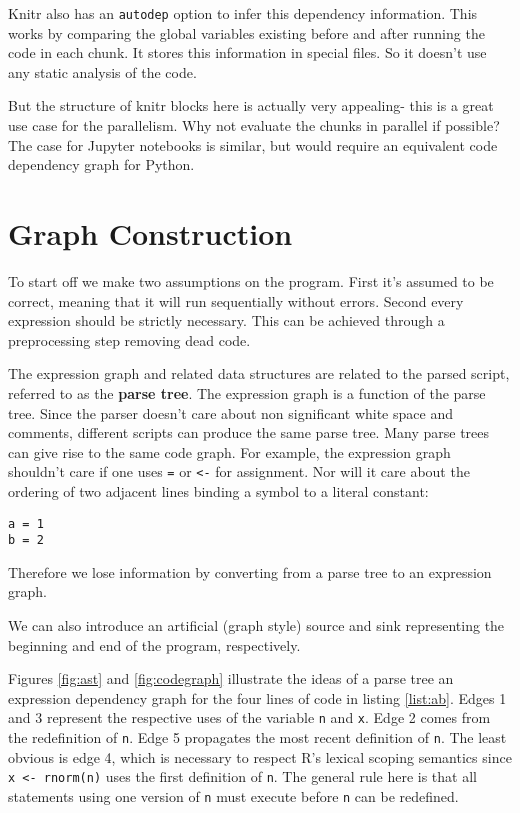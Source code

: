 \documentclass[12pt]{article}
\begin{document}
Knitr also has an \texttt{autodep} option to infer this dependency
information. This works by comparing the global variables existing before
and after running the code in each chunk. It stores this information in
special files. So it doesn't use any static analysis of the code.

But the structure of knitr blocks here is actually very appealing- this is
a great use case for the parallelism. Why not evaluate the chunks in
parallel if possible? The case for Jupyter notebooks is similar, but would
require an equivalent code dependency graph for Python.

\section{Graph Construction}

To start off we make two assumptions on the program. First it's assumed to
be correct, meaning that it will run sequentially without errors.
Second every expression should be strictly necessary. This can be achieved
through a preprocessing step removing dead code.

The expression graph and related data structures are related to the parsed
script, referred to as the \textbf{parse tree}. The expression
graph is a function of the parse tree. Since the parser
doesn't care about non significant white space and comments,  different
scripts can produce the same parse tree.  Many parse trees can give rise to
the same code graph. For example, the expression graph shouldn't care if one uses
\texttt{=} or \texttt{<-} for assignment. Nor will it care about the
ordering of two adjacent lines binding a symbol to a literal constant:

\begin{verbatim}
a = 1
b = 2
\end{verbatim}

Therefore we lose information by converting from a parse tree to an
expression graph.

We can also introduce an artificial (graph style) source and sink representing the
beginning and end of the program, respectively.

Figures \ref{fig:ast} and \ref{fig:codegraph} illustrate the ideas of
a parse tree an expression dependency
graph for the four lines of code in listing \ref{list:ab}.  Edges 1 and 3
represent the respective uses of the variable \texttt{n} and \texttt{x}.
Edge 2 comes from the redefinition of \texttt{n}.  Edge 5 propagates the
most recent definition of \texttt{n}.  The least obvious is edge 4, which
is necessary to respect R's lexical scoping semantics since \texttt{x <-
rnorm(n)} uses the first definition of \texttt{n}. The general rule here is
that all statements using one version of \texttt{n} must execute before
\texttt{n} can be redefined.
\end{document}
